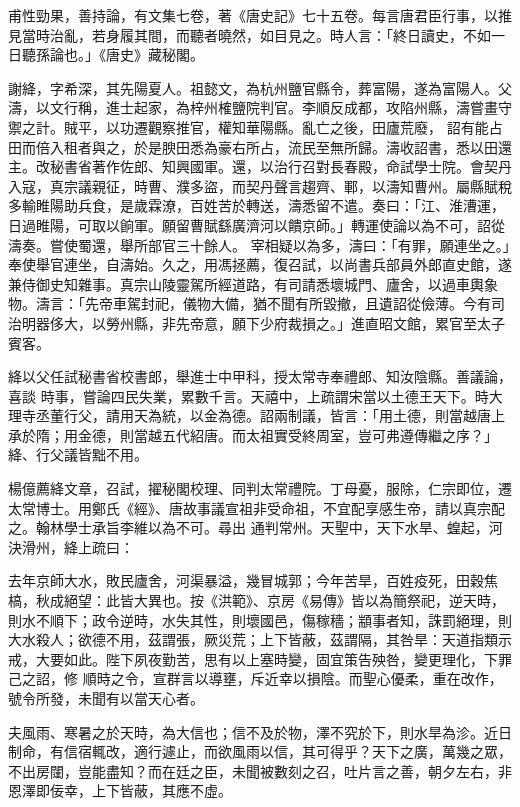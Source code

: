 \begin{pinyinscope}
 甫性勁果，善持論，有文集七卷，著《唐史記》七十五卷。每言唐君臣行事，以推見當時治亂，若身履其間，而聽者曉然，如目見之。時人言：「終日讀史，不如一日聽孫論也。」《唐史》藏秘閣。



 謝絳，字希深，其先陽夏人。祖懿文，為杭州鹽官縣令，葬富陽，遂為富陽人。父濤，以文行稱，進士起家，為梓州榷鹽院判官。李順反成都，攻陷州縣，濤嘗畫守禦之計。賊平，以功遷觀察推官，權知華陽縣。亂亡之後，田廬荒廢，
 詔有能占田而倍入租者與之，於是腴田悉為豪右所占，流民至無所歸。濤收詔書，悉以田還主。改秘書省著作佐郎、知興國軍。還，以治行召對長春殿，命試學士院。會契丹入寇，真宗議親征，時曹、濮多盜，而契丹聲言趨齊、鄆，以濤知曹州。屬縣賦稅多輸睢陽助兵食，是歲霖潦，百姓苦於轉送，濤悉留不遣。奏曰：「江、淮漕運，日過睢陽，可取以餉軍。願留曹賦繇廣濟河以饋京師。」轉運使論以為不可，詔從濤奏。嘗使蜀還，舉所部官三十餘人。
 宰相疑以為多，濤曰：「有罪，願連坐之。」奉使舉官連坐，自濤始。久之，用馮拯薦，復召試，以尚書兵部員外郎直史館，遂兼侍御史知雜事。真宗山陵靈駕所經道路，有司請悉壞城門、廬舍，以過車輿象物。濤言：「先帝車駕封祀，儀物大備，猶不聞有所毀撤，且遺詔從儉薄。今有司治明器侈大，以勞州縣，非先帝意，願下少府裁損之。」進直昭文館，累官至太子賓客。



 絳以父任試秘書省校書郎，舉進士中甲科，授太常寺奉禮郎、知汝陰縣。善議論，喜談
 時事，嘗論四民失業，累數千言。天禧中，上疏謂宋當以土德王天下。時大理寺丞董行父，請用天為統，以金為德。詔兩制議，皆言：「用土德，則當越唐上承於隋；用金德，則當越五代紹唐。而太祖實受終周室，豈可弗遵傳繼之序？」絳、行父議皆黜不用。



 楊億薦絳文章，召試，擢秘閣校理、同判太常禮院。丁母憂，服除，仁宗即位，遷太常博士。用鄭氏《經》、唐故事議宣祖非受命祖，不宜配享感生帝，請以真宗配之。翰林學士承旨李維以為不可。尋出
 通判常州。天聖中，天下水旱、蝗起，河決滑州，絳上疏曰：



 去年京師大水，敗民廬舍，河渠暴溢，幾冒城郭；今年苦旱，百姓疫死，田穀焦槁，秋成絕望：此皆大異也。按《洪範》、京房《易傳》皆以為簡祭祀，逆天時，則水不順下；政令逆時，水失其性，則壞國邑，傷稼穡；顓事者知，誅罰絕理，則大水殺人；欲德不用，茲謂張，厥災荒；上下皆蔽，茲謂隔，其咎旱：天道指類示戒，大要如此。陛下夙夜勤苦，思有以上塞時變，固宜策告殃咎，變更理化，下罪己之詔，修
 順時之令，宣群言以導壅，斥近幸以損陰。而聖心優柔，重在改作，號令所發，未聞有以當天心者。



 夫風雨、寒暑之於天時，為大信也；信不及於物，澤不究於下，則水旱為沴。近日制命，有信宿輒改，適行遽止，而欲風雨以信，其可得乎？天下之廣，萬幾之眾，不出房闥，豈能盡知？而在廷之臣，未聞被數刻之召，吐片言之善，朝夕左右，非恩澤即佞幸，上下皆蔽，其應不虛。




\end{pinyinscope}
